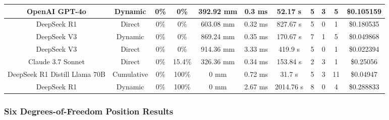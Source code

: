 \begin{landscape}
\begin{table}[H]
\begin{center}
\begin{tabular}{|c|c|c|c|c|c|c|c|c|c|c|}
    OpenAI GPT-4o & Dynamic & 0\% & 0\% & 392.92 mm & 0.3 ms & 52.17 s & 5 & 3 & 5 & \$0.105159 \\
    \hline
    DeepSeek R1 & Direct & 0\% & 0\% & 603.08 mm & 0.32 ms & 827.67 s & 5 & 0 & 1 & \$0.180535 \\
    \hline
    DeepSeek V3 & Dynamic & 0\% & 0\% & 869.24 mm & 0.35 ms & 170.67 s & 7 & 1 & 5 & \$0.049868 \\
    \hline
    DeepSeek V3 & Direct & 0\% & 0\% & 914.36 mm & 3.33 ms & 419.9 s & 5 & 0 & 1 & \$0.022394 \\
    \hline
    Claude 3.7 Sonnet & Direct & 0\% & 15.4\% & 326.36 mm & 0.34 ms & 153.84 s & 2 & 3 & 1 & \$0.25056 \\
    \hline
    DeepSeek R1 Distill Llama 70B & Cumulative & 0\% & 100\% & 0 mm & 0.72 ms & 31.7 s & 5 & 3 & 11 & \$0.04947 \\
    \hline
    DeepSeek R1 & Dynamic & 0\% & 100\% & 0 mm & 2.67 ms & 2014.76 s & 8 & 0 & 4 & \$0.288833 \\
    \hline
\end{tabular}
\label{Results-Position-2-6}
\end{center}
\end{table}

\subsubsection{Six Degrees-of-Freedom Position Results}


\end{landscape}
